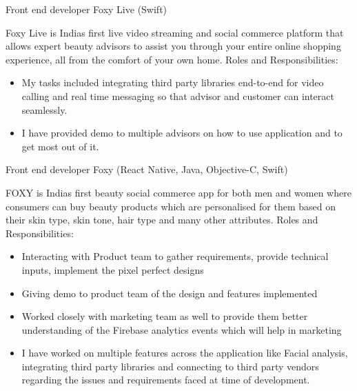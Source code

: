 \begin{cventries}
  \cventry
    {Front end developer}
    {Foxy Live \tiny(Swift)} %
    {} %
    {} %
    {
        Foxy Live is India\textquotesingle s first live video streaming and social commerce platform that allows expert beauty advisors to assist you through your entire online shopping experience, all from the comfort of your own home. \newline Roles and Responsibilities: 
        \begin{itemize}
            \item My tasks included integrating third party libraries end-to-end for video calling and real time messaging so that advisor and customer can interact seamlessly. 
            \item I have provided demo to multiple advisors on how to use application and to get most out of it.
        \end{itemize} 
    }
    
\vspace{-0.7em}

  \cventry
    {Front end developer}
    {Foxy \tiny(React Native, Java, Objective-C, Swift)} %
    {} %
    {} %
    {
        FOXY is India\textquotesingle s first beauty social commerce app for both men and women where consumers can buy beauty products which are personalised for them based on their skin type, skin tone, hair type and many other attributes. \newline Roles and Responsibilities: \begin{itemize}
            \item Interacting with Product team to gather requirements, provide technical inputs, implement the pixel perfect designs
            \item Giving demo to product team of the design and features implemented
            \item Worked closely with marketing team as well to provide them better understanding of the Firebase analytics events which will help in marketing
            \item I have worked on multiple features across the application like Facial analysis, integrating third party libraries and connecting to third party vendors regarding the issues and requirements faced at time of development.
        \end{itemize}
    }
\vspace{-0.7em}



\end{cventries}
